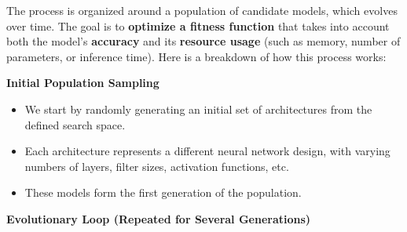 The process is organized around a population of candidate models, which evolves over time. The goal is to \textbf{optimize a fitness function} that takes into account both the model’s \textbf{accuracy} and its \textbf{resource usage} (such as memory, number of parameters, or inference time).
Here is a breakdown of how this process works:

\textbf{Initial Population Sampling}
\begin{itemize}
    \item We start by randomly generating an initial set of architectures from the defined search space.
    \item Each architecture represents a different neural network design, with varying numbers of layers, filter sizes, activation functions, etc.
    \item These models form the first generation of the population.


\end{itemize}

\textbf{Evolutionary Loop (Repeated for Several Generations)}

